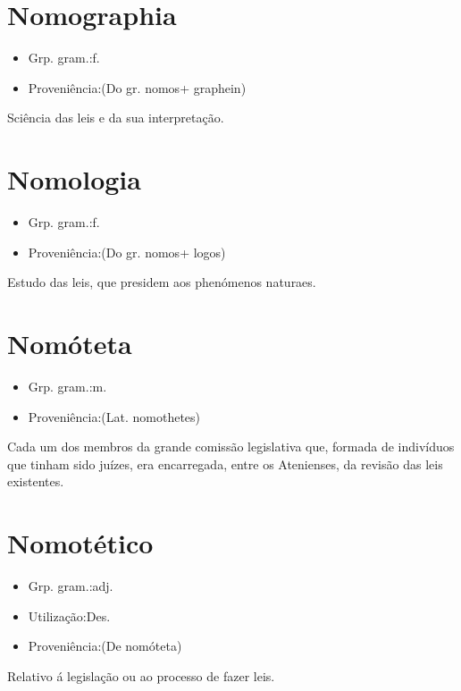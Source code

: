 \section{Nomographia}
\begin{itemize}
\item {Grp. gram.:f.}
\end{itemize}
\begin{itemize}
\item {Proveniência:(Do gr. \textunderscore nomos\textunderscore  + \textunderscore graphein\textunderscore )}
\end{itemize}
Sciência das leis e da sua interpretação.
\section{Nomologia}
\begin{itemize}
\item {Grp. gram.:f.}
\end{itemize}
\begin{itemize}
\item {Proveniência:(Do gr. \textunderscore nomos\textunderscore  + \textunderscore logos\textunderscore )}
\end{itemize}
Estudo das leis, que presidem aos phenómenos naturaes.
\section{Nomóteta}
\begin{itemize}
\item {Grp. gram.:m.}
\end{itemize}
\begin{itemize}
\item {Proveniência:(Lat. \textunderscore nomothetes\textunderscore )}
\end{itemize}
Cada um dos membros da grande comissão legislativa que, formada de indivíduos que tinham sido juízes, era encarregada, entre os Atenienses, da revisão das leis existentes.
\section{Nomotético}
\begin{itemize}
\item {Grp. gram.:adj.}
\end{itemize}
\begin{itemize}
\item {Utilização:Des.}
\end{itemize}
\begin{itemize}
\item {Proveniência:(De \textunderscore nomóteta\textunderscore )}
\end{itemize}
Relativo á legislação ou ao processo de fazer leis.
